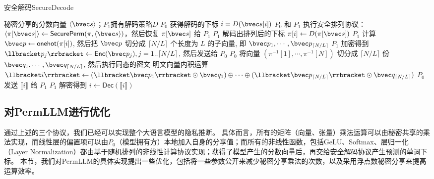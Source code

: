\begin{algorithm}[h]
    \caption{安全解码\textsf{SecureDecode}}
    \label{alg:perm-llm:prediction}
    \begin{algorithmic}[1]
    \Require 秘密分享的分数向量 $\langle \bvec s \rangle$；$P_1$拥有解码策略$D$
    \Ensure $P_0$ 获得解码的下标 $i = D(\bvec s[i])$
    \State $P_0$ 和 $P_1$ 执行安全排列协议： $\langle \pi[\bvec s] \rangle \gets \mathsf{SecurePerm}(\pi, \langle \bvec s \rangle)$，然后恢复 $\pi[\bvec s]$ 给 $P_1$
    \State $P_1$ 解码出排列后的下标 $\pi[i] \gets D(\pi[\bvec s])$
    \State $P_1$ 计算 $\bvec p \gets \mathsf{onehot}(\pi[i])$, 然后把 $\bvec p$ 切分成 $\lceil N/L \rceil$ 个长度为 $L$ 的子向量, 即 $\bvec p_1, \cdots, \bvec p_{\lceil N/L \rceil}$
    \State $P_1$ 加密得到 $\llbracket p_j \rrbracket \gets \mathsf{Enc}(\bvec p_j), j  = 1..{\lceil N/L \rceil}$, 然后发送给 $P_0$
    \State $P_0$ 将向量 $(\pi^{-1}[1], \cdots, \pi^{-1}[N])$ 切分成 $\lceil N/L \rceil$ 份 $\bvec q_1, \cdots, \bvec q_{\lceil N/L \rceil}$, 然后执行同态的密文-明文向量内积运算 $\llbracket i \rrbracket \gets (\llbracket \bvec p_1 \rrbracket \odot \bvec q_1) \oplus \cdots \oplus (\llbracket \bvec p_{\lceil N/L \rceil} \rrbracket \odot \bvec q_{\lceil N/L \rceil})$
    $P_0$发送 $\llbracket i \rrbracket$ 给 $P_1$
    \State $P_1$ 解密得到 $i \gets \mathsf{Dec}(\llbracket i \rrbracket)$
\end{algorithmic}
\end{algorithm}


\subsection{对PermLLM进行优化}
通过上述的三个协议，我们已经可以实现整个大语言模型的隐私推断。
%
具体而言，所有的矩阵（向量、张量）乘法运算可以由秘密共享的乘法实现，而线性层的偏置项可以由$P_0$（模型拥有方）本地加入自身的分享值；而所有的非线性函数，包括GeLU、Softmax、层归一化（Layer Normalization）都由基于随机排列的非线性计算协议实现；获得了模型产生的分数向量后，再交给安全解码协议产生预测的单词下标。
%
本节，我们对PermLLM的具体实现提出一些优化，包括将一些参数公开来减少秘密分享乘法的次数，以及采用浮点数秘密分享来提高运算效率。
%
